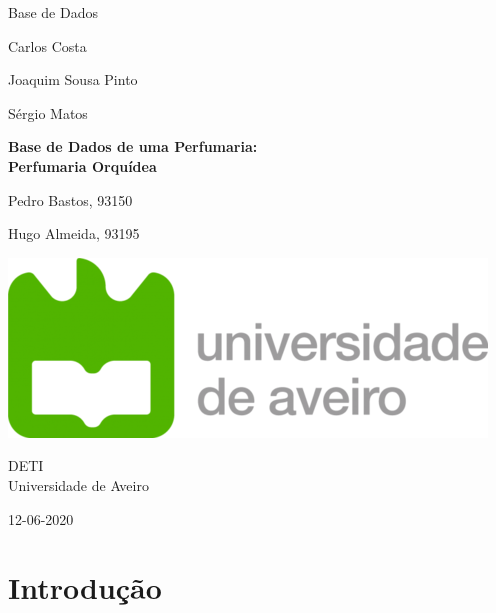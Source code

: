 \documentclass[10pt,portuguese]{article}
\begin{document}
\begin{titlepage}
	\clearpage\thispagestyle{empty}
	\centering
	\vspace{2cm}

	
	{\Large  Base de Dados \par}
	\vspace{0.5cm}
	{\small Carlos Costa\par
	Joaquim Sousa Pinto\par
	Sérgio Matos\par}
	\vspace{4cm}
	{ \textbf{Base de Dados de uma Perfumaria:}} \\
	\vspace{0.5cm}
	{\Huge \textbf{Perfumaria Orquídea}} \\
	\vspace{1cm}
	\vspace{4cm}
	{\normalsize  \par Pedro Bastos, 93150 \par Hugo Almeida, 93195
	   \par}
	 
	\vspace{2cm}

    \includegraphics[scale=0.20]{logo_ua.png}
    
    \vspace{2cm}
    
	{\normalsize DETI \\ 
		Universidade de Aveiro \par}
		
	{\normalsize 12-06-2020 \par}
	\vspace{2cm}
		
	
	\pagebreak

\end{titlepage}
\tableofcontents{}
\clearpage

\section{Introdução}
\end{document}
